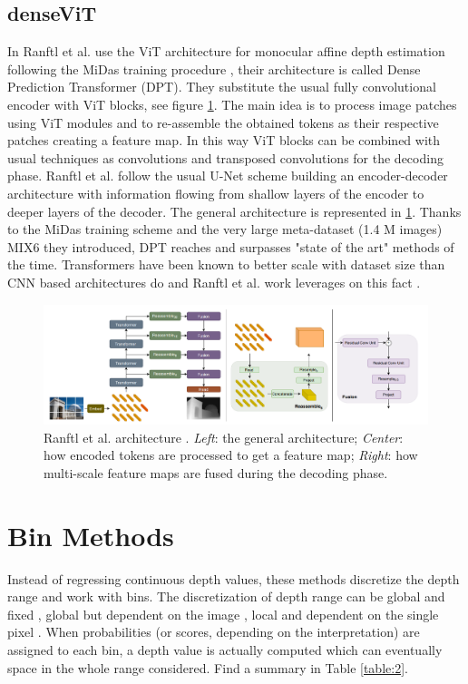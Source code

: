 \subsection{denseViT}
In \cite{denseViT} Ranftl et al. use the ViT \cite{ViT} architecture for monocular affine depth estimation following the MiDas training procedure \cite{MiDas}, their architecture is called Dense Prediction Transformer (DPT).
They substitute the usual fully convolutional encoder with ViT blocks, see figure \ref{fig:denseViT_architecture}.
The main idea is to process image patches using ViT modules and to re-assemble the obtained tokens as their respective patches creating a feature map.
In this way ViT blocks can be combined with usual techniques as convolutions and transposed convolutions for the decoding phase.
Ranftl et al. follow the usual U-Net \cite{UNet} scheme building an encoder-decoder architecture with information flowing from shallow layers of the encoder to deeper layers of the decoder.
The general architecture is represented in \ref{fig:denseViT_architecture}.
Thanks to the MiDas \cite{MiDas} training scheme and the very large meta-dataset (1.4 M images) MIX6 they introduced, DPT reaches and surpasses "state of the art" methods of the time.
Transformers have been known to better scale with dataset size than CNN based architectures do and Ranftl et al. work leverages on this fact \cite{ViT}.

\begin{figure}
\centering
\includegraphics[scale=0.3]{figs/denseViT_architecture}
\caption{Ranftl et al. architecture \cite{denseViT}. \textit{Left}: the general architecture; \textit{Center}: how encoded tokens are processed to get a feature map; \textit{Right}: how multi-scale feature maps are fused during the decoding phase. \label{fig:denseViT_architecture}}
\end{figure}

\section{Bin Methods}
\label{sec:bin_methods}
Instead of regressing continuous depth values, these methods discretize the depth range and work with bins.
The discretization of depth range can be global and fixed \cite{depth_as_classification, ordinal_regression}, global but dependent on the image \cite{AdaBins}, local and dependent on the single pixel \cite{ZoeDepth}.
When probabilities (or scores, depending on the interpretation) are assigned to each bin, a depth value is actually computed which can eventually space in the whole range considered.
Find a summary in Table \ref{table:2}.

